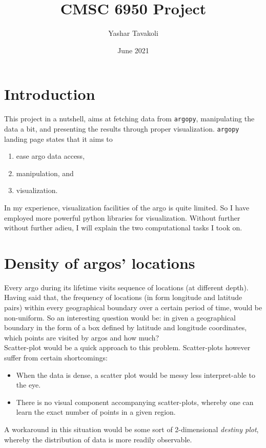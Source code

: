 \documentclass[12pt]{article}
\title{CMSC 6950 Project}
\date{June 2021}
\author{Yashar Tavakoli}
\begin{document}
\maketitle
\section{Introduction}

This project in a nutshell, aims at fetching data from \verb|argopy|, manipulating the data a bit, and presenting the results
through proper visualization. \verb|argopy| landing page states that it aims to 
\begin{enumerate}
    \item ease argo data access, 
    \item manipulation, and
    \item visualization. 
\end{enumerate} 
In my experience, visualization facilities of the argo is quite limited. So I have employed more powerful python
libraries for visualization. Without further without further adieu, I will explain the two computational tasks I
took on.

\section{Density of argos' locations}

Every argo during its lifetime visits sequence of 
locations (at different depth). Having said that, the frequency of
locations (in form longitude and latitude pairs) within every geographical boundary over a certain period of time,
would be non-uniform. So an interesting question would be: in given a geographical boundary in the form of a box defined
by latitude and longitude coordinates, which points are visited by argos and how much?\\

Scatter-plot would be a quick approach to this problem. Scatter-plots however suffer from certain shortcomings:

\begin{itemize}
    \item When the data is dense, a scatter plot would be messy less interpret-able to the eye. 
    \item There is no visual component accompanying scatter-plots, whereby one can learn the exact number of points in a given region.
\end{itemize}

A workaround in this situation would be some sort of 2-dimensional \textit{destiny plot}, whereby
the distribution of data is more readily observable. \\
\end{document}
